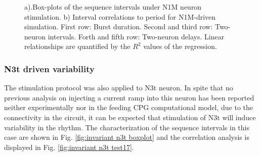 \begin{figure}[hbt!]
\begin{minipage}[b]{0.53\textwidth}
\begin{minipage}[b]{\textwidth}
		\end{minipage}
	\end{minipage}
	\caption{a).Box-plots of the  sequence intervals under N1M neuron stimulation. b) Interval correlations to period for N1M-driven simulation. First row: Burst duration. Second and third row: Two-neuron intervals. Forth and fifth row: Two-neuron delays. Linear relationships are quantified by the $R^2$ values of the regression.}
	\label{fig:invariant n1m}
\end{figure}





%
%      
%
%

\subsubsection{N3t driven variability}

The stimulation protocol was also applied to N3t neuron. In spite that no previous analysis on injecting a current ramp into this neuron has been reported neither experimentally nor in the feeding CPG computational model, due to the connectivity in the circuit, it can be expected that stimulation of N3t will induce variability in the rhythm. The characterization of the sequence intervals in this case are shown in Fig. 
\ref{fig:invariant n3t boxplot} and the correlation analysis is displayed in Fig. \ref{fig:invariant n3t test17}.


